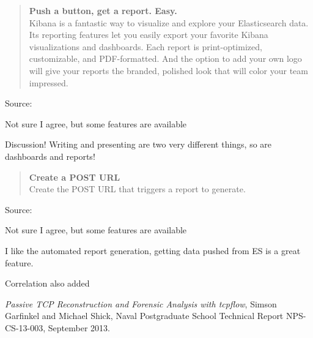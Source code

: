 \documentclass[Screen16to9,17pt]{foils}
\begin{document}

\begin{quote}{\bf
Push a button, get a report. Easy.}\\
Kibana is a fantastic way to visualize and explore your Elasticsearch data. Its reporting features let you easily export your favorite Kibana visualizations and dashboards. Each report is print-optimized, customizable, and PDF-formatted. And the option to add your own logo will give your reports the branded, polished look that will color your team impressed.
\end{quote}
Source: 


\begin{list2}
\item Not sure I agree, but some features are available
\item Discussion! Writing and presenting are two very different things, so are dashboards and reports!
\end{list2}



\begin{quote}{\bf
Create a POST URL}\\
Create the POST URL that triggers a report to generate.
\end{quote}
Source: 


\begin{list2}
\item Not sure I agree, but some features are available
\item I like the automated report generation, getting data pushed from ES is a great feature.
\item Correlation also added

\end{list2}





\begin{list2}
  \item {}
  \item \emph{Passive TCP Reconstruction and Forensic Analysis with tcpflow}, Simson Garfinkel and Michael Shick, Naval Postgraduate School Technical Report NPS-CS-13-003, September 2013.
\end{list2}




\slidenext{}
\end{document}
